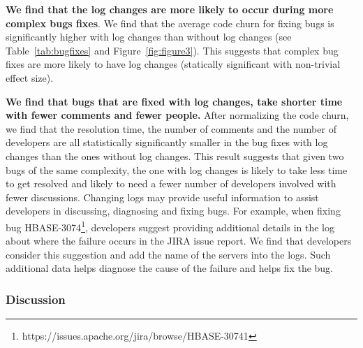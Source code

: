 \textbf{We find that the log changes are more likely to occur during more complex bugs fixes}. We find that the average code churn for fixing bugs is significantly higher with log changes than without log changes (see Table~\ref{tab:bugfixes} and Figure~\ref{fig:figure3}). This suggests that complex bug fixes are more likely to have log changes (statically significant with non-trivial effect size). 

\textbf{We find that bugs that are fixed with log changes, take shorter time with fewer comments and fewer people.} After normalizing the code churn, we find that the resolution time, the number of comments and the number of developers are all statistically significantly smaller in the bug fixes with log changes than the ones without log changes. This result suggests that given two bugs of the same complexity, the one with log changes is likely to take less time to get resolved and likely to need a fewer number of developers involved with fewer discussions. Changing logs may provide useful information to assist developers in discussing, diagnosing and fixing bugs. For example, when fixing bug HBASE-3074\footnote{https://issues.apache.org/jira/browse/HBASE-30741}, developers suggest providing additional details in the log about where the failure occurs in the JIRA issue report. We find that developers consider this suggestion and add the name of the servers into the logs. Such additional data helps diagnose the cause of the failure and helps fix the bug.

\subsubsection*{Discussion}




